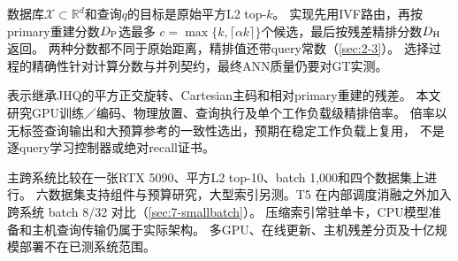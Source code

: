 数据库$\mathcal X\subset\mathbb R^d$和查询$q$的目标是原始平方L2 top-$k$。
实现先用IVF路由，再按primary重建分数$D_{\mathrm{P}}$选最多
$c=\max\{k,\lceil\alpha k\rceil\}$个候选，最后按残差精排分数$D_{\mathrm{H}}$返回。
两种分数都不同于原始距离，精排值还带query常数（\cref{sec:2-3}）。
选择过程的精确性针对计算分数与并列契约，最终ANN质量仍要对GT实测。

表示继承JHQ的平方正交旋转、Cartesian主码和相对primary重建的残差。
本文研究GPU训练／编码、物理放置、查询执行及单个工作负载级精排倍率。
倍率以无标签查询输出和大预算参考的一致性选出，预期在稳定工作负载上复用，
不是逐query学习控制器或绝对recall证书。

主跨系统比较在一张RTX 5090、平方L2 top-10、batch 1,000和四个数据集上进行。
六数据集支持组件与预算研究，大型索引另测。T5 在内部调度消融之外加入跨系统 batch 8/32 对比（\cref{sec:7-smallbatch}）。
压缩索引常驻单卡，CPU模型准备和主机查询传输仍属于实际架构。
多GPU、在线更新、主机残差分页及十亿规模部署不在已测系统范围。
